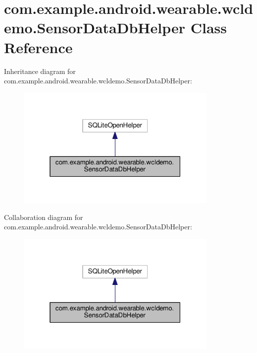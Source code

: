 \hypertarget{classcom_1_1example_1_1android_1_1wearable_1_1wcldemo_1_1SensorDataDbHelper}{}\section{com.\+example.\+android.\+wearable.\+wcldemo.\+Sensor\+Data\+Db\+Helper Class Reference}
\label{classcom_1_1example_1_1android_1_1wearable_1_1wcldemo_1_1SensorDataDbHelper}


Inheritance diagram for com.\+example.\+android.\+wearable.\+wcldemo.\+Sensor\+Data\+Db\+Helper\+:
\nopagebreak
\begin{figure}[H]
\begin{center}
\leavevmode
\includegraphics[width=277pt]{de/d31/classcom_1_1example_1_1android_1_1wearable_1_1wcldemo_1_1SensorDataDbHelper__inherit__graph}
\end{center}
\end{figure}


Collaboration diagram for com.\+example.\+android.\+wearable.\+wcldemo.\+Sensor\+Data\+Db\+Helper\+:
\nopagebreak
\begin{figure}[H]
\begin{center}
\leavevmode
\includegraphics[width=277pt]{d5/d5c/classcom_1_1example_1_1android_1_1wearable_1_1wcldemo_1_1SensorDataDbHelper__coll__graph}
\end{center}
\end{figure}
